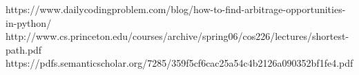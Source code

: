\documentclass{article}
\begin{document}
\pagebreak
\begin{thebibliography}{999}

        https://www.dailycodingproblem.com/blog/how-to-find-arbitrage-opportunities-in-python/
        http://www.cs.princeton.edu/courses/archive/spring06/cos226/lectures/shortest-path.pdf
    https://pdfs.semanticscholar.org/7285/359f5cf6cac25a54c4b2126a090352bf1fe4.pdf
    \end{thebibliography}
\end{document}
